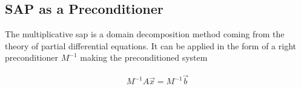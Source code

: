 \documentclass{article}
\theoremstyle{plain} %
\theoremstyle{convention} %
\theoremstyle{remark} %
\numberwithin{equation}{section}
\begin{document}
\subsection{SAP as a Preconditioner}

The multiplicative \acrlong{sap} is a domain decomposition method coming from the theory of partial differential equations. It can be applied in the form of a right preconditioner $M^{-1}$ making the preconditioned system

\begin{align}
    M^{-1} A \vec{x} = M^{-1} \vec{b} \label{eq:sap:preconditioned}
\end{align}
\end{document}
